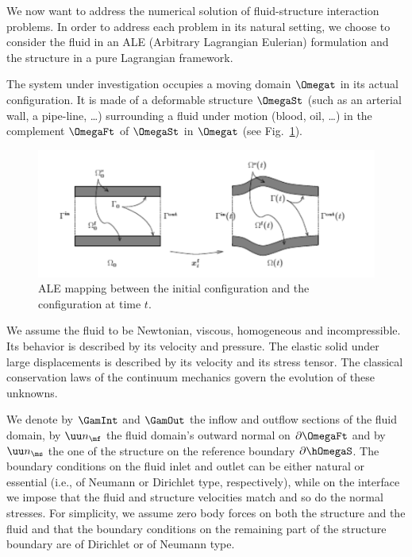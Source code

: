 


We now want to address the numerical solution of fluid-structure interaction problems.
In order to address each problem in its natural setting, we
choose to consider the fluid in an ALE (Arbitrary Lagrangian
Eulerian) formulation and the structure in a pure Lagrangian framework.

The system under investigation occupies a moving domain $\Omegat$
in its actual configuration. It is made of a deformable structure
$\OmegaSt$ (such as an arterial wall, a pipe-line, \ldots)
surrounding a fluid under motion (blood, oil, \ldots) in  the
complement $\OmegaFt$ of  $\OmegaSt$ in $\Omegat$ (see
Fig.~\ref{fig:ALEmapping}).

\begin{figure}[!h]
\begin{center}
\includegraphics[width=.8\textwidth]{ALEmapping.pdf}
\end{center}
\caption{ALE mapping between the initial configuration and the
configuration at time $t$.}\label{fig:ALEmapping}
\end{figure}

We assume the fluid to be Newtonian, viscous, homogeneous and
incompressible. Its behavior is described by its velocity and
pressure. The elastic solid under large displacements is
described by its velocity and its stress tensor. The classical
conservation laws of the continuum mechanics govern the evolution
of these unknowns.

We denote by $\GamInt$ and $\GamOut$ the inflow and outflow
sections of the fluid domain, by $\uu n_\mf$ the  fluid domain's
outward normal on $\partial \OmegaFt$ and by $\uu n_\ms$ the one
of the structure on the reference boundary $\partial \hOmegaS$.
The boundary conditions on the fluid inlet and outlet can be
either natural or essential (i.e., of Neumann or Dirichlet type,
respectively), while on the interface we impose that the fluid
and structure velocities match and so do the normal stresses. For
simplicity, we assume zero body forces on both the structure and
the fluid and that the boundary conditions on the remaining part
of the structure boundary are of Dirichlet or of Neumann type.

